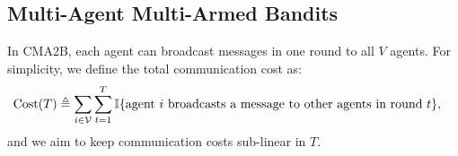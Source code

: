 \subsection{Multi-Agent Multi-Armed Bandits}
\label{sec:cma2b}

In CMA2B, each agent can broadcast messages in one round to all $V$ agents. For simplicity, we define the total communication cost as:
\begin{align*}
\textrm{Cost}(T)\triangleq \sum_{i\in {\mathcal{V}}}\sum_{t = 1}^{T}\mathbb{I}\{&\mathrm{agent~}i\text{ broadcasts a message to other agents in round } t\},   
\end{align*} and we aim to keep communication costs sub-linear in $T$.

